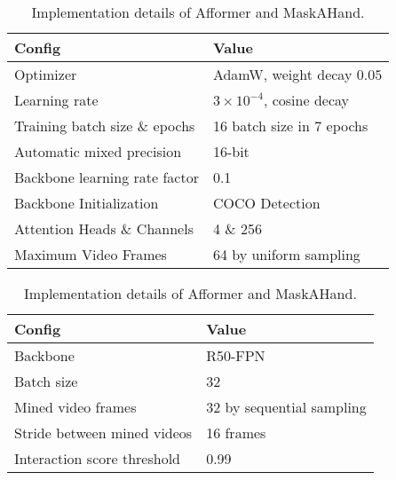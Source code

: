 \documentclass[10pt,twocolumn,letterpaper]{article}
\begin{document}
\begin{table}[h]
\footnotesize
\centering
\begin{subtable}{\linewidth}
\centering
\begin{tabular}{l|l}
\hline
    Config & Value \\
    \hline
    Optimizer & AdamW, weight decay $0.05$ \\
    Learning rate & $3\times10^{-4}$, cosine decay \\
    Training batch size \& epochs & 16 batch size in 7 epochs \\ 
    Automatic mixed precision & 16-bit \\
    Backbone learning rate factor & 0.1 \\
    Backbone Initialization & COCO Detection~\cite{faster_rcnn,coco} \\
    Attention Heads \& Channels & 4 \& 256 \\
    Maximum Video Frames & 64 by uniform sampling\\
    \hline
\end{tabular}
\end{subtable}
\begin{subtable}{\linewidth}
\centering
\begin{tabular}{l|l}
\hline
    Config & Value \\
    \hline
    Backbone & R50-FPN~\cite{resnet,fpn} \\
    Batch size & 32 \\
    Mined video frames & 32 by sequential sampling\\
    Stride between mined videos & 16 frames \\
    Interaction score threshold & 0.99 \\
    \hline
\end{tabular}
\end{subtable}
\caption{Implementation details of Afformer and MaskAHand.}\label{tablea}
\end{table}
\end{document}

